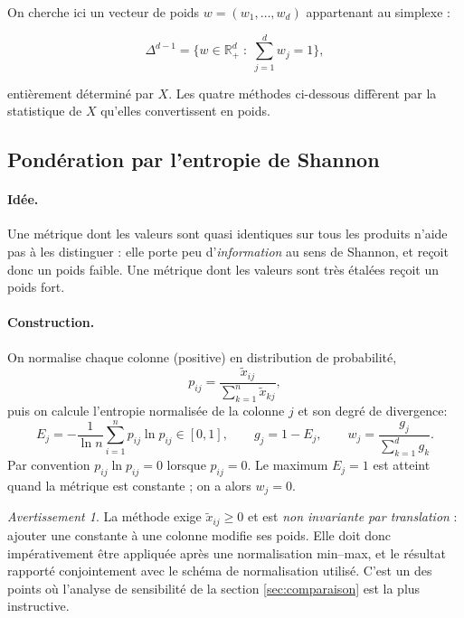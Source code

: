 \documentclass[11pt,a4paper]{article}
\theoremstyle{definition}
\theoremstyle{remark}
\newtheorem{avertissement}{Avertissement}[section]
\newcommand{\R}{\mathbb{R}}
\newcommand{\simplex}{\Delta^{d-1}}
\begin{document}
\medskip

On cherche ici un vecteur de poids $w = (w_1,\dots,w_d)$ appartenant au simplexe :

\medskip

\[
\simplex = \Big\{ w \in \R^d_+ \;:\; \textstyle\sum_{j=1}^d w_j = 1 \Big\},
\]

\bigskip

entièrement déterminé par $X$. Les quatre méthodes ci-dessous diffèrent par la statistique de $X$
qu'elles convertissent en poids.

\subsection{Pondération par l'entropie de Shannon}
\label{sec:entropie}

\paragraph{Idée.} Une métrique dont les valeurs sont quasi identiques sur tous les produits
n'aide pas à les distinguer : elle porte peu d'\emph{information} au sens de Shannon, et reçoit
donc un poids faible. Une métrique dont les valeurs sont très étalées reçoit un poids fort.

\paragraph{Construction.} On normalise chaque colonne (positive) en distribution de probabilité,
\[
p_{ij} = \frac{\tilde{x}_{ij}}{\sum_{k=1}^n \tilde{x}_{kj}},
\]
puis on calcule l'entropie normalisée de la colonne $j$ et son degré de divergence:
\[
E_j = -\frac{1}{\ln n}\sum_{i=1}^n p_{ij}\ln p_{ij} \in [0,1],
\qquad
g_j = 1 - E_j,
\qquad
w_j = \frac{g_j}{\sum_{k=1}^d g_k}.
\]
Par convention $p_{ij}\ln p_{ij} = 0$ lorsque $p_{ij}=0$. Le maximum $E_j = 1$ est atteint quand la
métrique est constante ; on a alors $w_j = 0$.

\bigskip

\begin{avertissement}
  La méthode exige $\tilde{x}_{ij} \ge 0$ et est \emph{non invariante par translation} : ajouter une
  constante à une colonne modifie ses poids. Elle doit donc impérativement être appliquée après une
  normalisation min--max, et le résultat rapporté conjointement avec le schéma de normalisation
  utilisé. C'est un des points où l'analyse de sensibilité de la section \ref{sec:comparaison} est
  la plus instructive.
\end{avertissement}
\end{document}
